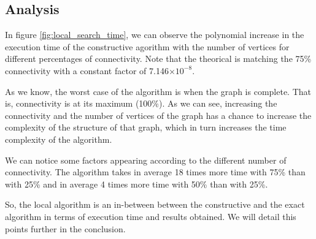 
    \subsection{Analysis}

    In figure \ref{fig:local_search_time}, we can observe the polynomial increase in the execution time of the constructive agorithm with the number of vertices for different percentages of connectivity. Note that the theorical is matching the 75\% connectivity with a constant factor of 7.146$\times10^{-8}$.
    \bigskip
    
    As we know, the worst case of the algorithm is when the graph is complete. That is, connectivity is at its maximum (100\%). As we can see, increasing the connectivity and the number of vertices of the graph has a chance to increase the complexity of the structure of that graph, which in turn increases the time complexity of the algorithm. 
    \bigskip
    
    We can notice some factors appearing according to the different number of connectivity. The algorithm takes in average 18 times more time with 75\% than with 25\% and in average 4 times more time with 50\% than with 25\%.
    \bigskip
    
    So, the local algorithm is an in-between between the constructive and the exact algorithm in terms of execution time and results obtained. We will detail this points further in the conclusion.